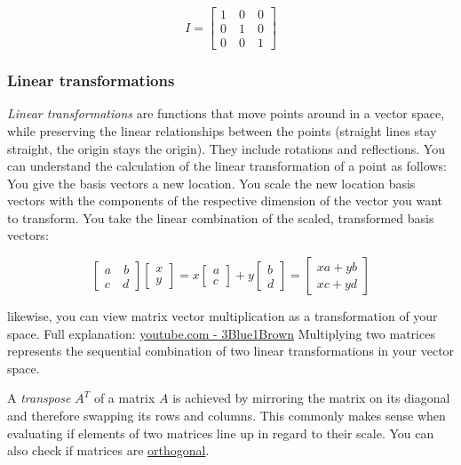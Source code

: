 \documentclass[
]{book}
\begin{document}
\[
I = \begin{bmatrix}
1 \quad 0 \quad 0 \\
0 \quad 1 \quad 0 \\
0 \quad 0 \quad 1
\end{bmatrix}
\]

\hypertarget{linear-transformations}{%
\subsubsection{Linear transformations}\label{linear-transformations}}

\emph{Linear transformations} are functions that move points around in a
vector space, while preserving the linear relationships between the
points (straight lines stay straight, the origin stays the origin). They
include rotations and reflections. You can understand the calculation of
the linear transformation of a point as follows: You give the basis
vectors a new location. You scale the new location basis vectors with
the components of the respective dimension of the vector you want to
transform. You take the linear combination of the scaled, transformed
basis vectors:

\[\begin{bmatrix} a \quad b \\ c \quad d \end{bmatrix} 
\begin{bmatrix} x \\ y \end{bmatrix}
  = x \begin{bmatrix} a \\ c \end{bmatrix} + y \begin{bmatrix} b \\ d \end{bmatrix} = \begin{bmatrix} x a  + y b \\ x c + y d \end{bmatrix}
\]

likewise, you can view matrix vector multiplication as a transformation
of your space. Full explanation: \href{https://youtu.be/kYB8IZa5AuE}{youtube.com -
3Blue1Brown} Multiplying two matrices
represents the sequential combination of two linear transformations in
your vector space.

A \emph{transpose} \(A^T\) of a matrix \(A\) is achieved by mirroring the matrix
on its diagonal and therefore swapping its rows and columns. This
commonly makes sense when evaluating if elements of two matrices line up
in regard to their scale. You can also check if matrices are
\href{https://en.wikipedia.org/wiki/Orthogonal_matrix}{orthogonal}.
\end{document}

